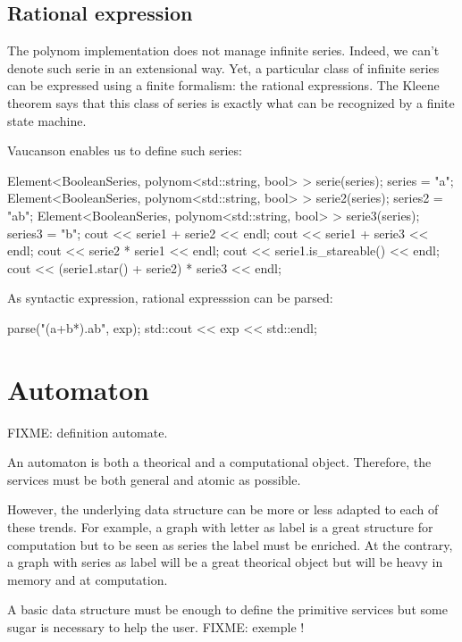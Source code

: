 \documentclass{article}
\begin{document}
\subsection{Rational expression}

The polynom implementation does not manage infinite series. Indeed, we
can't denote such serie in an extensional way. Yet, a particular class
of infinite series can be expressed using a finite formalism: the
rational expressions. The Kleene theorem says that this class of
series is exactly what can be recognized by a finite state machine.

Vaucanson enables us to define such series:

\begin{code}
Element<BooleanSeries, polynom<std::string, bool> > serie(series);
series = "a";
Element<BooleanSeries, polynom<std::string, bool> > serie2(series);
series2 = "ab";
Element<BooleanSeries, polynom<std::string, bool> > serie3(series);
series3 = "b";
cout << serie1 + serie2 << endl;
cout << serie1 + serie3 << endl;
cout << serie2 * serie1 << endl;
cout << serie1.is_stareable() << endl;
cout << (serie1.star() + serie2) * serie3 << endl; 
\end{code}

As syntactic expression, rational expresssion can be parsed:

\begin{code}
parse("(a+b*).ab", exp);
std::cout << exp << std::endl;
\end{code}

\section{Automaton}

FIXME: definition automate.

An automaton is both a theorical and a computational object.
Therefore, the services must be both general and atomic as possible. 

However, the underlying data structure can be more or less adapted to each of these trends. For example, a graph with letter as label is a great structure for computation but to be seen as series the label must be enriched. At the contrary, a graph with series as label will be a great theorical object but will be heavy in memory and at computation.

A basic data structure must be enough to define the primitive services but some sugar is necessary to help the user. FIXME: exemple !
\end{document}
